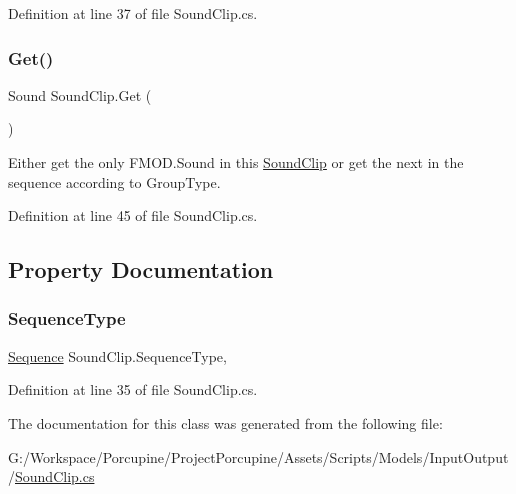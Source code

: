 Definition at line 37 of file Sound\+Clip.\+cs.

\mbox{\label{class_sound_clip_af6035e81f4d6a3a72d85109f4537a15d}} 
\subsubsection{\texorpdfstring{Get()}{Get()}}
{\footnotesize\ttfamily Sound Sound\+Clip.\+Get (\begin{DoxyParamCaption}{ }\end{DoxyParamCaption})}



Either get the only F\+M\+O\+D.\+Sound in this \hyperlink{class_sound_clip}{Sound\+Clip} or get the next in the sequence according to Group\+Type. 



Definition at line 45 of file Sound\+Clip.\+cs.



\subsection{Property Documentation}
\mbox{\label{class_sound_clip_aead0e9776d9167de7b11194c3d7e3654}} 
\subsubsection{\texorpdfstring{Sequence\+Type}{SequenceType}}
{\footnotesize\ttfamily \hyperlink{class_sound_clip_a81daec2536e567316099f0e16adefb79}{Sequence} Sound\+Clip.\+Sequence\+Type\hspace{0.3cm}{\ttfamily [get]}, {\ttfamily [set]}}



Definition at line 35 of file Sound\+Clip.\+cs.



The documentation for this class was generated from the following file\+:\begin{DoxyCompactItemize}
\item 
G\+:/\+Workspace/\+Porcupine/\+Project\+Porcupine/\+Assets/\+Scripts/\+Models/\+Input\+Output/\hyperlink{_sound_clip_8cs}{Sound\+Clip.\+cs}\end{DoxyCompactItemize}
